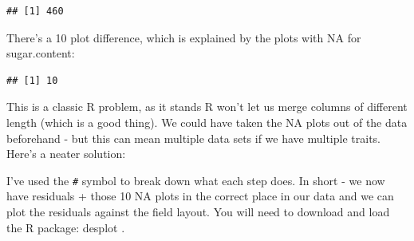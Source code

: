 \documentclass[
]{book}
\newenvironment{Shaded}{\begin{snugshade}}{\end{snugshade}}
\newcommand{\CommentTok}[1]{\textcolor[rgb]{0.56,0.35,0.01}{\textit{#1}}}
\newcommand{\ConstantTok}[1]{\textcolor[rgb]{0.00,0.00,0.00}{#1}}
\newcommand{\FunctionTok}[1]{\textcolor[rgb]{0.00,0.00,0.00}{#1}}
\newcommand{\NormalTok}[1]{#1}
\newcommand{\OtherTok}[1]{\textcolor[rgb]{0.56,0.35,0.01}{#1}}
\newcommand{\SpecialCharTok}[1]{\textcolor[rgb]{0.00,0.00,0.00}{#1}}
\begin{document}
\begin{Shaded}
\end{Shaded}

\begin{verbatim}
## [1] 460
\end{verbatim}

There's a 10 plot difference, which is explained by the plots with NA for sugar.content:

\begin{Shaded}
\end{Shaded}

\begin{verbatim}
## [1] 10
\end{verbatim}

This is a classic R problem, as it stands R won't let us merge columns of different length (which is a good thing). We could have taken the NA plots out of the data beforehand - but this can mean multiple data sets if we have multiple traits. Here's a neater solution:

\begin{Shaded}
\end{Shaded}

I've used the \texttt{\#} symbol to break down what each step does. In short - we now have residuals + those 10 NA plots in the correct place in our data and we can plot the residuals against the field layout. You will need to download and load the R package: desplot \citep{R-desplot}.
\end{document}
